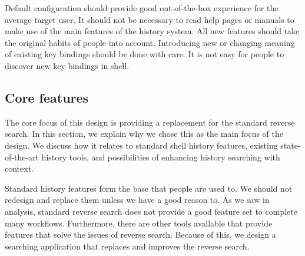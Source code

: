 \documentclass[thesis=M,english]{FITthesis}[2012/10/20]
\begin{document}
Default configuration should provide good out-of-the-box experience for the average target user. It should not be necessary to read help pages or manuals to make use of the main features of the history system. 
All new features should take the original habits of people into account. 
Introducing new or changing meaning of existing key bindings should be done with care. It is not easy for people to discover new key bindings in shell.


\subsection{Core features}

The core focus of this design is providing a replacement for the standard reverse search. In this section, we explain why we chose this as the main focus of the design. We discuss how it relates to standard shell history features, existing state-of-the-art history tools, and possibilities of enhancing history searching with context.





Standard history features form the base that people are used to. We should not redesign and replace them unless we have a good reason to.
As we saw in analysis, standard reverse search does not provide a good feature set to complete many workflows. Furthermore, there are other tools available that provide features that solve the issues of reverse search. Because of this, we design a searching application that replaces and improves the reverse search.

\end{document}
